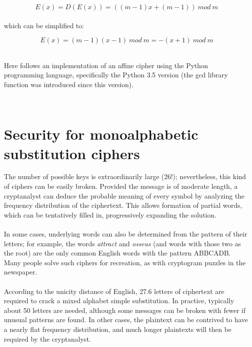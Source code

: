 \documentclass[Lau,binding=0.6cm,oneside]{sapthesis}
\begin{document}
\begin{equation}
E{(x)} = D{(E{(x)})} = ((m-1)x + (m-1)) \ mod \ m
\end{equation}
\ \\
which can be simplified to:

\begin{equation}
E{(x)} = (m-1)(x-1) \ mod \ m = -(x+1) \ mod \ m
\end{equation}

\ \\
Here follows an implementation of an affine cipher using the Python programming language, specifically the Python 3.5 version (the gcd library function was introduced since this version).\\


\ \\
\section{Security for monoalphabetic substitution ciphers}
The number of possible keys is extraordinarily large (26!); nevertheless, this kind of ciphers can be easily broken. Provided the message is of moderate length, a cryptanalyst can deduce the probable meaning of every symbol by analyzing the frequency distribution of the ciphertext. This allows formation of partial words, which can be tentatively filled in, progressively expanding the solution.\\\\
In some cases, underlying words can also be determined from the pattern of their letters; for example, the words \textit{attract} and \textit{osseus} (and words with those two as the root) are the only common English words with the pattern \textsf{ABBCADB}. Many people solve such ciphers for recreation, as with cryptogram puzzles in the newspaper.\\\\
According to the unicity distance of English, 27.6 letters of ciphertext are required to crack a mixed alphabet simple substitution. In practice, typically about 50 letters are needed, although some messages can be broken with fewer if unusual patterns are found. In other cases, the plaintext can be contrived to have a nearly flat frequency distribution, and much longer plaintexts will then be required by the cryptanalyst.
\end{document}
